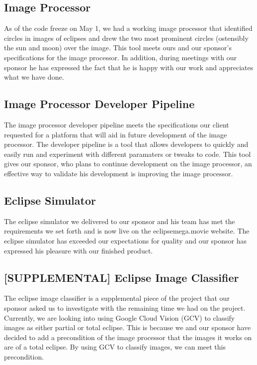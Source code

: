 \documentclass[10pt, onecolumn, draftclsnofoot, letterpaper, compsoc]{IEEEtran}
\begin{document}
\subsection{Image Processor}

As of the code freeze on May 1, we had a working image processor that identified
circles in images of eclipses and drew the two most prominent circles
(ostensibly the sun and moon) over the image. This tool meets ours and our
sponsor's specifications for the image processor. In addition, during meetings
with our sponsor he has expressed the fact that he is happy with our work and
appreciates what we have done. \\

\subsection{Image Processor Developer Pipeline}

The image processor developer pipeline meets the specifications our client
requested for a platform that will aid in future development of the image
processor. The developer pipeline is a tool that allows developers to quickly
and easily run and experiment with different paramaters or tweaks to code. This
tool gives our sponsor, who plans to continue development on the image processor,
an effective way to validate his development is improving the image processor. \\

\subsection{Eclipse Simulator}

The eclipse simulator we delivered to our sponsor and his team has met the
requirements we set forth and is now live on the eclipsemega.movie website. The
eclipse simulator has exceeded our expectations for quality and our sponsor has
expressed his pleasure with our finished product. \\

\subsection{[SUPPLEMENTAL] Eclipse Image Classifier}

The eclipse image classifier is a supplemental piece of the project that our
sponsor asked us to investigate with the remaining time we had on the project.
Currently, we are looking into using Google Cloud Vision (GCV) to classify images
as either partial or total eclipse. This is because we and our sponsor have
decided to add a precondition of the image processor that the images it works
on are of a total eclipse. By using GCV to classify images, we can meet this
precondition. \\
\end{document}
